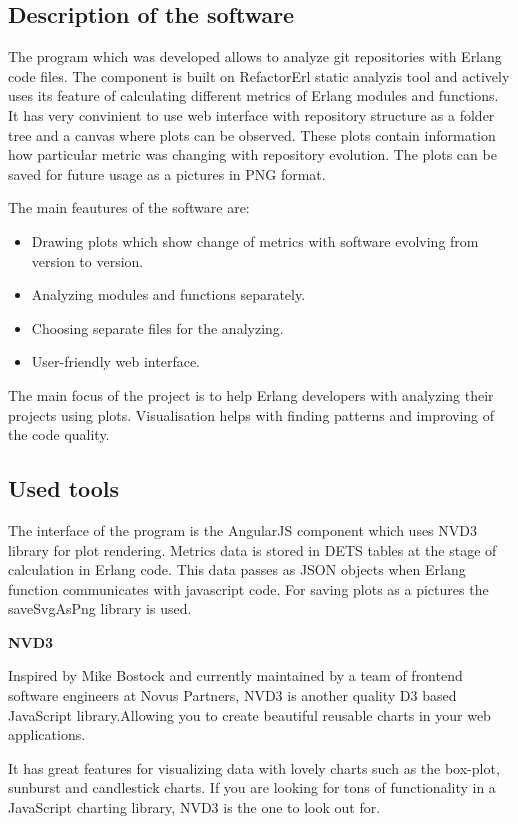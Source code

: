 \subsection{Description of the software}

The program which was developed allows to analyze git repositories with Erlang code files. The component is built on RefactorErl static analyzis tool and actively uses its feature of calculating different metrics of Erlang modules and functions. It has very convinient to use web interface with repository structure as a folder tree and a canvas where plots can be observed. These plots contain information how particular metric was changing with repository evolution. The plots can be saved for future usage as a pictures in PNG format.

The main feautures of the software are:
\begin{itemize}
	\item Drawing plots which show change of metrics with software evolving from version to version.
	\item Analyzing modules and functions separately.
	\item Choosing separate files for the analyzing.
	\item User-friendly web interface.
\end{itemize}

The main focus of the project is to help Erlang developers with analyzing their projects using plots. Visualisation helps with finding patterns and improving of the code quality. 

\subsection{Used tools}

The interface of the program is the AngularJS component which uses NVD3 library for plot rendering. Metrics data is stored in DETS tables at the stage of calculation in Erlang code. This data passes as JSON objects when Erlang function communicates with javascript code. For saving plots as a pictures the saveSvgAsPng library is used.

\textbf{NVD3}

Inspired by Mike Bostock and currently maintained by a team of frontend software engineers at Novus Partners, NVD3 is another quality D3 based JavaScript library.Allowing you to create beautiful reusable charts in your web applications.

It has great features for visualizing data with lovely charts such as the box-plot, sunburst and candlestick charts. If you are looking for tons of functionality in a JavaScript charting library, NVD3 is the one to look out for.


